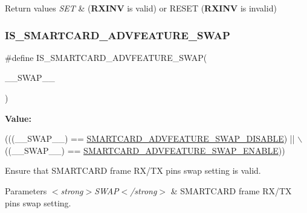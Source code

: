 \begin{DoxyRetVals}{Return values}
{\em S\+ET} & ({\bfseries R\+X\+I\+NV} is valid) or R\+E\+S\+ET ({\bfseries R\+X\+I\+NV} is invalid) \\
\hline
\end{DoxyRetVals}
\mbox{\label{group___s_m_a_r_t_c_a_r_d___private___macros_gaafa60ea938020acb9b18923735759198}} 
\subsubsection{\texorpdfstring{I\+S\+\_\+\+S\+M\+A\+R\+T\+C\+A\+R\+D\+\_\+\+A\+D\+V\+F\+E\+A\+T\+U\+R\+E\+\_\+\+S\+W\+AP}{IS\_SMARTCARD\_ADVFEATURE\_SWAP}}
{\footnotesize\ttfamily \#define I\+S\+\_\+\+S\+M\+A\+R\+T\+C\+A\+R\+D\+\_\+\+A\+D\+V\+F\+E\+A\+T\+U\+R\+E\+\_\+\+S\+W\+AP(\begin{DoxyParamCaption}\item[{}]{\+\_\+\+\_\+\+S\+W\+A\+P\+\_\+\+\_\+ }\end{DoxyParamCaption})}

{\bfseries Value\+:}
\begin{DoxyCode}
(((\_\_SWAP\_\_) == \hyperlink{group___s_m_a_r_t_c_a_r_d___rx___tx___swap_gaa7575142ae9044abf0df73607d72ea9b}{SMARTCARD\_ADVFEATURE\_SWAP\_DISABLE}) || \(\backslash\)
                                                ((\_\_SWAP\_\_) == 
      \hyperlink{group___s_m_a_r_t_c_a_r_d___rx___tx___swap_ga9cf5e77dd48e998670181874b71375ed}{SMARTCARD\_ADVFEATURE\_SWAP\_ENABLE}))
\end{DoxyCode}


Ensure that S\+M\+A\+R\+T\+C\+A\+RD frame R\+X/\+TX pins swap setting is valid. 


\begin{DoxyParams}{Parameters}
{\em $<$strong$>$\+S\+W\+A\+P$<$/strong$>$} & S\+M\+A\+R\+T\+C\+A\+RD frame R\+X/\+TX pins swap setting. \\
\hline
\end{DoxyParams}

